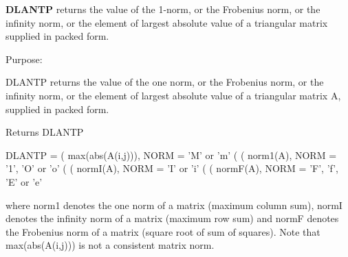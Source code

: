 {\bfseries D\+L\+A\+N\+T\+P} returns the value of the 1-\/norm, or the Frobenius norm, or the infinity norm, or the element of largest absolute value of a triangular matrix supplied in packed form. 

 \begin{DoxyParagraph}{Purpose\+: }
\begin{DoxyVerb} DLANTP  returns the value of the one norm,  or the Frobenius norm, or
 the  infinity norm,  or the  element of  largest absolute value  of a
 triangular matrix A, supplied in packed form.\end{DoxyVerb}

\end{DoxyParagraph}
\begin{DoxyReturn}{Returns}
D\+L\+A\+N\+T\+P \begin{DoxyVerb}    DLANTP = ( max(abs(A(i,j))), NORM = 'M' or 'm'
             (
             ( norm1(A),         NORM = '1', 'O' or 'o'
             (
             ( normI(A),         NORM = 'I' or 'i'
             (
             ( normF(A),         NORM = 'F', 'f', 'E' or 'e'

 where  norm1  denotes the  one norm of a matrix (maximum column sum),
 normI  denotes the  infinity norm  of a matrix  (maximum row sum) and
 normF  denotes the  Frobenius norm of a matrix (square root of sum of
 squares).  Note that  max(abs(A(i,j)))  is not a consistent matrix norm.\end{DoxyVerb}
 
\end{DoxyReturn}

